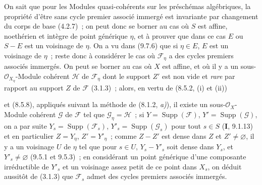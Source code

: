 On sait que pour les Modules quasi-cohérents sur les préschémas algébriques, la
propriété d'être sans cycle premier associé immergé est invariante par
changement du corps de base (4.2.7)~; on peut donc se borner au cas où $S$ est
affine, noethérien et intègre de point générique $\eta$, et à prouver que dans
ce cas $E$ ou $S-E$ est un voisinage de $\eta$. On a vu dans (9.7.6) que si
$\eta\in E$, $E$ est un voisinage de $\eta$~; reste donc à considérer le cas où
$\mathcal F_\eta$ a des cycles premiers associés immergés. On peut se borner au
cas où $X$ est affine, et où il y a un sous-$\mathcal O_{X_\eta}$-Module
cohérent $\mathcal H$ de $\mathcal F_\eta$ dont le support $Z'$ est non vide et
\emph{rare} par rapport au support $Z$ de $\mathcal F$ (3.1.3)~; alors, en vertu
de (8.5.2, (i) et (ii))


et (8.5.8), appliqués suivant la méthode de (8.1.2, \emph{a)}), il existe un
sous-$\mathcal O_X$-Module cohérent $\mathcal G$ de $\mathcal F$ tel que
$\mathcal G_\eta=\mathcal H$~; si $Y=\operatorname{Supp}(\mathcal F)$,
$Y'=\operatorname{Supp}(\mathcal G)$, on a par suite
$Y_s=\operatorname{Supp}(\mathcal F_s)$, $Y'_s=\operatorname{Supp}(\mathcal G_s)$
pour tout $s\in S$ (\textbf{I}, 9.1.13) et en particulier $Z=Y_\eta$,
$Z'=Y'_\eta$~; comme $Z-Z'$ est dense dans $Z$ et $Z'\neq\varnothing$, il y a
un voisinage $U$ de $\eta$ tel que pour $s\in U$, $Y_s-Y'_s$ soit dense dans
$Y_s$, et $Y'_s\neq\varnothing$ (9.5.1 et 9.5.3)~; en considérant un point
générique d'une composante irréductible de $Y'_s$ et un voisinage assez petit de
ce point dans $X_s$, on déduit aussitôt de (3.1.3) que $\mathcal F_s$ admet des
cycles premiers associés immergés.

